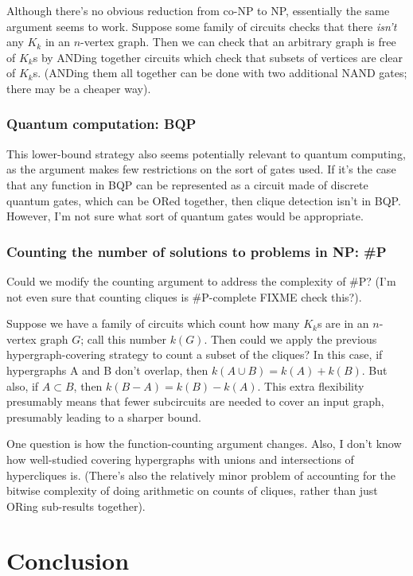 \documentclass[12pt]{article}
\theoremstyle{definition}
\begin{document}
Although there's no obvious reduction from co-NP to NP, essentially
the same argument seems to work. Suppose some family of circuits
checks that there {\em isn't} any $K_k$ in an $n$-vertex graph.
Then we can check that an arbitrary graph is free of $K_k$s by
ANDing together circuits which check that subsets of vertices are
clear of $K_k$s. (ANDing them all together can be done with
two additional NAND gates; there may be a cheaper way).

\subsubsection{Quantum computation: BQP}

This lower-bound strategy also seems potentially
relevant to quantum computing,
as the argument makes few restrictions on the sort of gates used.
If it's the case that any function in BQP can be represented
as a circuit made of discrete quantum gates, which can be
ORed together, then clique detection isn't in BQP.
However, I'm not sure what sort of quantum gates would be
appropriate.

\subsubsection{Counting the number of solutions to problems in NP: \#P}

Could we modify the counting argument to address the complexity 
of \#P? (I'm not even sure that counting cliques is
\#P-complete FIXME check this?).

Suppose we have a family of circuits which count how
many $K_k$s are in an $n$-vertex graph $G$; call this number
$k(G)$. Then could we apply the
previous hypergraph-covering strategy to count a subset of the
cliques? In this case, if hypergraphs A and B don't overlap, then
$k(A \cup B) = k(A)+k(B)$. 
But also, if $A \subset B$, then $k(B - A) = k(B)-k(A)$. 
This extra flexibility presumably means that fewer subcircuits are
needed to cover an input graph, presumably leading to a sharper bound.

One question is how the function-counting argument changes.
Also, I don't know how well-studied
covering hypergraphs with unions and intersections of
hypercliques is.
(There's also the relatively minor problem of accounting for
the bitwise complexity of doing arithmetic on counts of cliques,
rather than just ORing sub-results
together).

\section{Conclusion}
\end{document}
